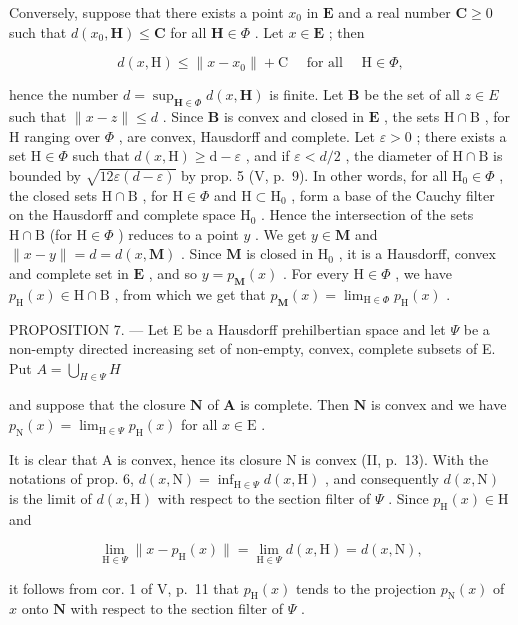 Conversely, suppose that there exists a point \(x_0\) in \(\mathbf{E}\) and a real number \(\mathbf{C} \geqslant 0\) such that \(d(x_0, \mathbf{H}) \leqslant \mathbf{C}\) for all \(\mathbf{H} \in \Phi\) . Let \(x \in \mathbf{E}\) ; then

\[
d (x, \mathrm{H}) \leqslant \| x - x _ {0} \| + \mathrm{C} \quad \text { for   all } \quad \mathrm{H} \in \Phi ,
\]

hence the number \(d = \sup_{\mathbf{H} \in \Phi} d(x, \mathbf{H})\) is finite. Let \(\mathbf{B}\) be the set of all \(z \in E\) such that \(\| x - z\| \leqslant d\) . Since \(\mathbf{B}\) is convex and closed in \(\mathbf{E}\) , the sets \(\mathrm{H} \cap \mathrm{B}\) , for \(\mathrm{H}\) ranging over \(\Phi\) , are convex, Hausdorff and complete. Let \(\varepsilon > 0\) ; there exists a set \(\mathrm{H} \in \Phi\) such that \(d(x, \mathrm{H}) \geqslant \mathrm{d} - \varepsilon\) , and if \(\varepsilon < d/2\) , the diameter of \(\mathrm{H} \cap \mathrm{B}\) is bounded by \(\sqrt{12\varepsilon(d - \varepsilon)}\) by prop. 5 (V, p.~9). In other words, for all \(\mathrm{H}_0 \in \Phi\) , the closed sets \(\mathrm{H} \cap \mathrm{B}\) , for \(\mathrm{H} \in \Phi\) and \(\mathrm{H} \subset \mathrm{H}_0\) , form a base of the Cauchy filter on the Hausdorff and complete space \(\mathrm{H}_0\) . Hence the intersection of the sets \(\mathrm{H} \cap \mathrm{B}\) (for \(\mathrm{H} \in \Phi\) ) reduces to a point \(y\) . We get \(y \in \mathbf{M}\) and \(\| x - y \| = d = d(x, \mathbf{M})\) . Since \(\mathbf{M}\) is closed in \(\mathrm{H}_0\) , it is a Hausdorff, convex and complete set in \(\mathbf{E}\) , and so \(y = p_{\mathbf{M}}(x)\) . For every \(\mathrm{H} \in \Phi\) , we have \(p_{\mathrm{H}}(x) \in \mathrm{H} \cap \mathrm{B}\) , from which we get that \(p_{\mathbf{M}}(x) = \lim_{\mathrm{H} \in \Phi} p_{\mathrm{H}}(x)\) .

PROPOSITION 7. --- Let E be a Hausdorff prehilbertian space and let \(\Psi\) be a non-empty directed increasing set of non-empty, convex, complete subsets of E. Put \(A = \bigcup_{H \in \Psi} H\)

and suppose that the closure \(\mathbf{N}\) of \(\mathbf{A}\) is complete. Then \(\mathbf{N}\) is convex and we have \(p_{\mathrm{N}}(x) = \lim_{\mathrm{H}\in \Psi}p_{\mathrm{H}}(x)\) for all \(x\in \mathrm{E}\) .

It is clear that A is convex, hence its closure N is convex (II, p.~13). With the notations of prop. 6, \(d(x, \mathrm{N}) = \inf_{\mathrm{H} \in \Psi} d(x, \mathrm{H})\) , and consequently \(d(x, \mathrm{N})\) is the limit of \(d(x, \mathrm{H})\) with respect to the section filter of \(\Psi\) . Since \(p_{\mathrm{H}}(x) \in \mathrm{H}\) and

\[
\lim _ {\mathrm{H} \in \Psi} \| x - p _ {\mathrm{H}} (x) \| = \lim _ {\mathrm{H} \in \Psi} d (x, \mathrm{H}) = d (x, \mathrm{N}),
\]

it follows from cor. 1 of V, p.~11 that \(p_{\mathrm{H}}(x)\) tends to the projection \(p_{\mathrm{N}}(x)\) of \(x\) onto \(\mathbf{N}\) with respect to the section filter of \(\Psi\) .

